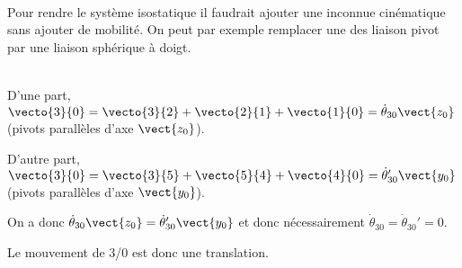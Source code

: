 \ifprof
\begin{corrige}~\\
Pour rendre le système isostatique il faudrait ajouter une inconnue cinématique sans ajouter de mobilité. On peut par exemple remplacer une des liaison pivot par une liaison sphérique à doigt. 
\end{corrige}
\else
\fi


\ifprof
\begin{corrige}~\\

D'une part, $\vecto{3}{0}=\vecto{3}{2}+\vecto{2}{1}+\vecto{1}{0}=\dot{\theta}_{30}\vect{z_0}$ (pivots parallèles d'axe $\vect{z_0}$).

D'autre part, $\vecto{3}{0}=\vecto{3}{5}+\vecto{5}{4}+\vecto{4}{0}=\dot{\theta}_{30}'\vect{y_0}$ (pivots parallèles d'axe $\vect{y_0}$).

On a donc $\dot{\theta}_{30}\vect{z_0} = \dot{\theta}_{30}'\vect{y_0}$ et donc nécessairement $\dot{\theta}_{30}=\dot{\theta}_{30}'=0$. 

Le mouvement de 3/0 est donc une translation. 
\end{corrige}
\else
\fi


